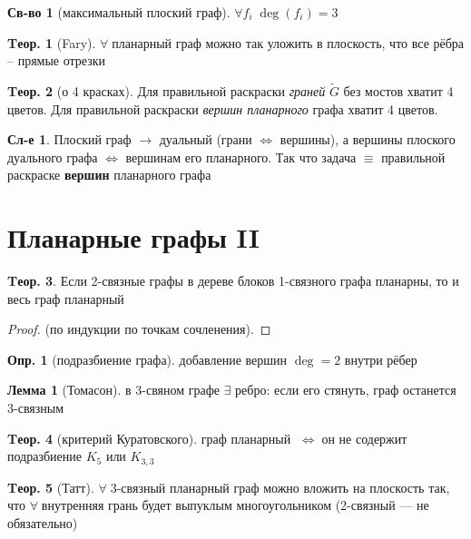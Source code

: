 \documentclass[a4paper,12pt]{article}
\numberwithin{figure}{section}
\theoremstyle{definition}
\newtheorem{definition}{Опр.}[section]
\newtheorem*{property}{Св-во}  %
\theoremstyle{definition}
\newtheorem{theorem}{Tеор.}[section]
\newtheorem*{corollary}{Сл-е} %
\newtheorem{lemma}{Лемма}[section]
\def\iiff{$\;\Longleftrightarrow\;$}
\def\iiany{$\forall\;$}
\begin{document}
\begin{property}[максимальный плоский граф]
	$\forall f_i \; \deg(f_i)=3$
\end{property}

\begin{theorem}[Fary]
	\iiany планарный граф можно так уложить в плоскость, что все рёбра -- прямые отрезки 
\end{theorem}

\begin{theorem}[о 4 красках]
	Для правильной раскраски \textit{граней} $\tilde{G}$ без мостов хватит 4 цветов.
	Для правильной раскраски \textit{вершин планарного} графа хватит 4 цветов.
\end{theorem}

\begin{corollary}
	Плоский граф $\longrightarrow$ дуальный (грани $\Leftrightarrow$ вершины), а вершины плоского дуального графа $\Leftrightarrow$ вершинам его планарного. Так что задача $\equiv$ правильной раскраске \textbf{вершин} планарного графа
\end{corollary}

\section{Планарные графы II}

\begin{theorem}
	Если 2-связные графы в дереве блоков 1-связного графа планарны, то и весь граф планарный 
\end{theorem}
\begin{proof}
	(по индукции по точкам сочленения).
\end{proof}

\begin{definition}[подразбиение графа] добавление вершин $\deg=2$ внутри рёбер \end{definition}

\begin{lemma}[Томасон]
	в 3-свяном графе $\exists$ ребро: если его стянуть, граф останется 3-связным
\end{lemma}

\begin{theorem}[критерий Куратовского]
	граф планарный \iiff он не содержит подразбиение $K_5$ или $K_{3,3}$
\end{theorem}

\begin{theorem}[Татт]
	\iiany 3-связный планарный граф можно вложить на плоскость так, что \iiany внутренняя грань будет выпуклым многоугольником (2-связный --- не обязательно)
\end{theorem}
\end{document}
